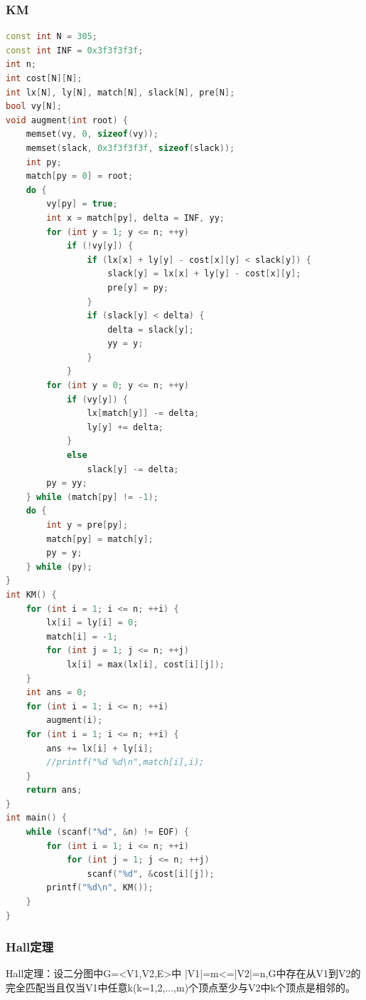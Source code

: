\documentclass[UTF8,a4paper,titlepage]{ctexart}
\begin{document}
\subsubsection*{KM}
\begin{lstlisting}[language=C++]
const int N = 305;
const int INF = 0x3f3f3f3f;
int n;
int cost[N][N];
int lx[N], ly[N], match[N], slack[N], pre[N];
bool vy[N];
void augment(int root) {
	memset(vy, 0, sizeof(vy));
	memset(slack, 0x3f3f3f3f, sizeof(slack));
	int py;
	match[py = 0] = root;
	do {
		vy[py] = true;
		int x = match[py], delta = INF, yy;
		for (int y = 1; y <= n; ++y)
			if (!vy[y]) {
				if (lx[x] + ly[y] - cost[x][y] < slack[y]) {
					slack[y] = lx[x] + ly[y] - cost[x][y];
					pre[y] = py;
				}
				if (slack[y] < delta) {
					delta = slack[y];
					yy = y;
				}
			}
		for (int y = 0; y <= n; ++y)
			if (vy[y]) {
				lx[match[y]] -= delta;
				ly[y] += delta;
			}
			else
				slack[y] -= delta;
		py = yy;
	} while (match[py] != -1);
	do {
		int y = pre[py];
		match[py] = match[y];
		py = y;
	} while (py);
}
int KM() {
	for (int i = 1; i <= n; ++i) {
		lx[i] = ly[i] = 0;
		match[i] = -1;
		for (int j = 1; j <= n; ++j)
			lx[i] = max(lx[i], cost[i][j]);
	}
	int ans = 0;
	for (int i = 1; i <= n; ++i)
		augment(i);
	for (int i = 1; i <= n; ++i) {
		ans += lx[i] + ly[i];
		//printf("%d %d\n",match[i],i);
	}
	return ans;
}
int main() {
	while (scanf("%d", &n) != EOF) {
		for (int i = 1; i <= n; ++i)
			for (int j = 1; j <= n; ++j)
				scanf("%d", &cost[i][j]);
		printf("%d\n", KM());
	}
}
\end{lstlisting}

\subsubsection{Hall定理}
Hall定理：设二分图中G=<V1,V2,E>中 |V1|=m<=|V2|=n,G中存在从V1到V2的完全匹配当且仅当V1中任意k(k=1,2,...,m)个顶点至少与V2中k个顶点是相邻的。
\end{document}
